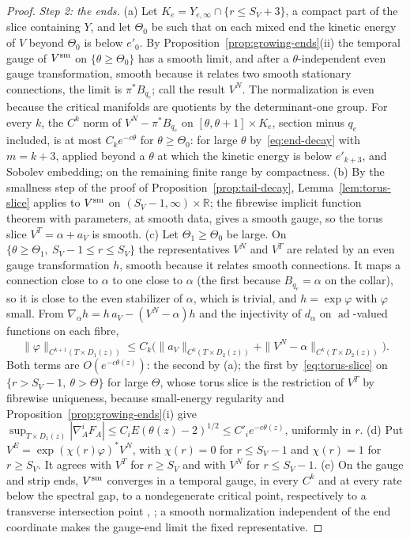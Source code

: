 \documentclass[11pt]{amsart}
\theoremstyle{definition}
\theoremstyle{remark}
\theoremstyle{plain}
\numberwithin{equation}{section}
\newcommand{\RR}{\mathbb{R}}
\newcommand{\ad}{\operatorname{ad}}
\begin{document}
\begin{proof}
\emph{Step 2: the ends.} (a) Let $K_e=Y_{e,\infty}\cap\{r\le S_V+3\}$, a compact part of the slice
containing $Y$, and let $\Theta_0$ be such that on each mixed end the kinetic energy of $V$ beyond
$\Theta_0$ is below $e'_0$. By Proposition~\ref{prop:growing-ends}(ii) the temporal gauge of $V^{\rm sm}$
on $\{\theta\ge\Theta_0\}$ has a smooth limit, and after a $\theta$-independent even gauge transformation,
smooth because it relates two smooth stationary connections, the limit is $\pi^*B_{q_e}$; call
the result $V^N$. The normalization is even because the critical manifolds are quotients by
the determinant-one group. For every $k$, the $C^k$ norm of $V^N-\pi^*B_{q_e}$ on
$[\theta,\theta+1]\times K_e$, section minus $q_e$ included, is at most $C_ke^{-c\theta}$ for $\theta\ge\Theta_0$: for
large $\theta$ by~\eqref{eq:end-decay} with $m=k+3$, applied beyond a $\theta$ at which the kinetic
energy is below $e'_{k+3}$, and Sobolev embedding; on the remaining finite range by
compactness.
(b) By the smallness step of the proof of Proposition~\ref{prop:tail-decay},
Lemma~\ref{lem:torus-slice} applies to $V^{\rm sm}$ on $(S_V-1,\infty)\times\RR$; the fibrewise implicit
function theorem with parameters, at smooth data, gives a smooth gauge, so the torus slice
$V^T=\alpha+a_V$ is smooth.
(c) Let $\Theta_1\ge\Theta_0$ be large. On $\{\theta\ge\Theta_1,\ S_V-1\le r\le S_V\}$ the representatives $V^N$
and $V^T$ are related by an even gauge transformation $h$, smooth because it relates smooth
connections. It maps a
connection close to $\alpha$ to one close to $\alpha$ (the first because $B_{q_e}=\alpha$ on the
collar), so it is close to the even stabilizer of $\alpha$, which is trivial, and $h=\exp\varphi$ with
$\varphi$ small. From $\nabla_\alpha h=h\,a_V-(V^N-\alpha)h$ and the injectivity of $d_\alpha$ on
$\ad$-valued functions on each fibre,
\[
\|\varphi\|_{C^{k+1}(T\times D_1(z))}\le C_k\bigl(\|a_V\|_{C^k(T\times D_2(z))}+\|V^N-\alpha\|_{C^k(T\times D_2(z))}\bigr).
\]
Both terms are $O(e^{-c\theta(z)})$: the second by (a); the first by~\eqref{eq:torus-slice} on
$\{r>S_V-1,\ \theta>\Theta\}$ for large $\Theta$, whose torus slice is the restriction of $V^T$ by
fibrewise uniqueness, because small-energy regularity and
Proposition~\ref{prop:growing-ends}(i) give
$\sup_{T\times D_1(z)}|\nabla^i_AF_A|\le C_iE(\theta(z)-2)^{1/2}\le C'_ie^{-c\theta(z)}$, uniformly in $r$.
(d) Put $V^{E}=\exp(\chi(r)\varphi)^*V^N$, with $\chi(r)=0$ for $r\le S_V-1$ and $\chi(r)=1$ for $r\ge S_V$. It
agrees with $V^T$ for $r\ge S_V$ and with $V^N$ for $r\le S_V-1$.
(e) On the gauge and strip ends, $V^{\rm sm}$ converges in a temporal gauge, in every $C^k$ and at
every rate below the spectral gap, to a nondegenerate critical point, respectively to a
transverse intersection point \cite[Section~4.1]{Donaldson-book}, \cite{RS-strips}; a
smooth normalization independent of the end coordinate makes the gauge-end limit the fixed
representative.


\end{proof}
\end{document}

